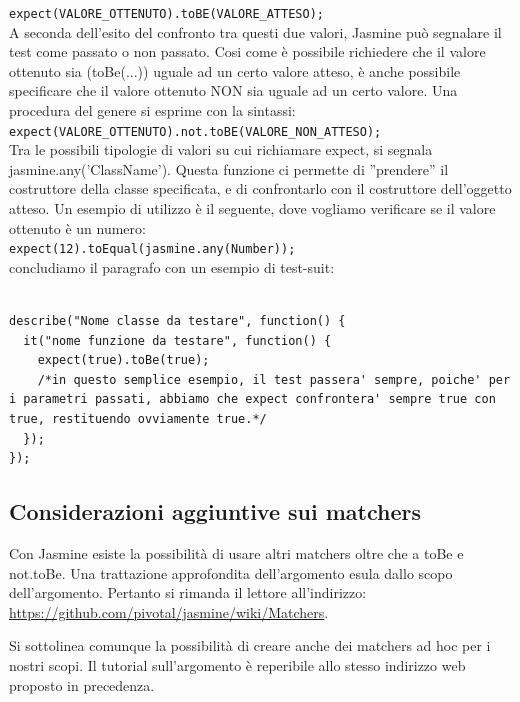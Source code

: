 \documentclass[10pt,a4paper,onecolumn]{article}
\begin{document}
\verb|expect(VALORE_OTTENUTO).toBE(VALORE_ATTESO);|\\

A seconda dell'esito del confronto tra questi due valori, Jasmine può segnalare il test come passato o non passato. Cosi come è possibile richiedere che il valore ottenuto sia (toBe(...)) uguale ad un certo valore atteso, è anche possibile specificare che il valore ottenuto NON sia uguale ad un certo valore. Una procedura del genere si esprime con la sintassi:\\

\verb|expect(VALORE_OTTENUTO).not.toBE(VALORE_NON_ATTESO);|\\

Tra le possibili tipologie di valori su cui richiamare expect, si segnala jasmine.any('ClassName'). Questa funzione ci permette di ''prendere'' il costruttore della classe specificata, e di confrontarlo con il costruttore dell'oggetto atteso. Un esempio di utilizzo è il seguente, dove vogliamo verificare se il valore ottenuto è un numero:\\

\verb|expect(12).toEqual(jasmine.any(Number));|\\

concludiamo il paragrafo con un esempio di test-suit:

\begin{lstlisting}

describe("Nome classe da testare", function() {
  it("nome funzione da testare", function() {
    expect(true).toBe(true);
    /*in questo semplice esempio, il test passera' sempre, poiche' per i parametri passati, abbiamo che expect confrontera' sempre true con true, restituendo ovviamente true.*/
  });
});

\end{lstlisting}

\subsection{Considerazioni aggiuntive sui matchers}

Con Jasmine esiste la possibilità di usare altri matchers oltre che a toBe e not.toBe. Una trattazione approfondita dell'argomento esula dallo scopo dell'argomento. Pertanto si rimanda il lettore all'indirizzo: \url{https://github.com/pivotal/jasmine/wiki/Matchers}. 

Si sottolinea comunque la possibilità di creare anche dei matchers ad hoc per i nostri scopi. Il tutorial sull'argomento è reperibile allo stesso indirizzo web proposto in precedenza.
\end{document}
